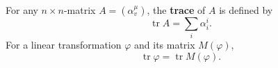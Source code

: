 For any $n \times n$-matrix $A = (\alpha_v^\mu)$, the \textbf{trace} of $A$ is defined by
$$\operatorname{tr} A = \sum_i \alpha_i^i.$$
For a linear transformation $\varphi$ and its matrix $M(\varphi)$,
$$\operatorname{tr} \varphi = \operatorname{tr} M(\varphi).$$
